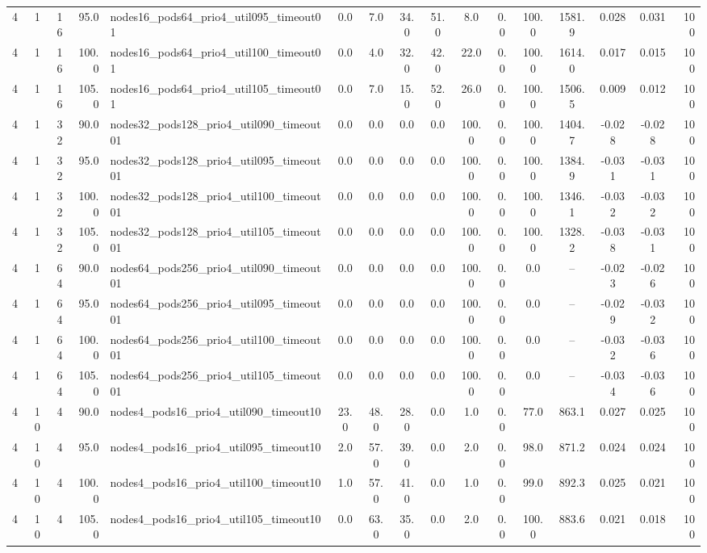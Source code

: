 \begin{tabular}{r r r r l c c c c c c c c c c r}
4 & 1 & 16 & 95.0 & nodes16\_pods64\_prio4\_util095\_timeout01 & 0.0 & 7.0 & 34.0 & 51.0 & 8.0 & 0.0 & 100.0 & 1581.9 & 0.028 & 0.031 & 100 \\
4 & 1 & 16 & 100.0 & nodes16\_pods64\_prio4\_util100\_timeout01 & 0.0 & 4.0 & 32.0 & 42.0 & 22.0 & 0.0 & 100.0 & 1614.0 & 0.017 & 0.015 & 100 \\
4 & 1 & 16 & 105.0 & nodes16\_pods64\_prio4\_util105\_timeout01 & 0.0 & 7.0 & 15.0 & 52.0 & 26.0 & 0.0 & 100.0 & 1506.5 & 0.009 & 0.012 & 100 \\
4 & 1 & 32 & 90.0 & nodes32\_pods128\_prio4\_util090\_timeout01 & 0.0 & 0.0 & 0.0 & 0.0 & 100.0 & 0.0 & 100.0 & 1404.7 & -0.028 & -0.028 & 100 \\
4 & 1 & 32 & 95.0 & nodes32\_pods128\_prio4\_util095\_timeout01 & 0.0 & 0.0 & 0.0 & 0.0 & 100.0 & 0.0 & 100.0 & 1384.9 & -0.031 & -0.031 & 100 \\
4 & 1 & 32 & 100.0 & nodes32\_pods128\_prio4\_util100\_timeout01 & 0.0 & 0.0 & 0.0 & 0.0 & 100.0 & 0.0 & 100.0 & 1346.1 & -0.032 & -0.032 & 100 \\
4 & 1 & 32 & 105.0 & nodes32\_pods128\_prio4\_util105\_timeout01 & 0.0 & 0.0 & 0.0 & 0.0 & 100.0 & 0.0 & 100.0 & 1328.2 & -0.038 & -0.031 & 100 \\
4 & 1 & 64 & 90.0 & nodes64\_pods256\_prio4\_util090\_timeout01 & 0.0 & 0.0 & 0.0 & 0.0 & 100.0 & 0.0 & 0.0 & -- & -0.023 & -0.026 & 100 \\
4 & 1 & 64 & 95.0 & nodes64\_pods256\_prio4\_util095\_timeout01 & 0.0 & 0.0 & 0.0 & 0.0 & 100.0 & 0.0 & 0.0 & -- & -0.029 & -0.032 & 100 \\
4 & 1 & 64 & 100.0 & nodes64\_pods256\_prio4\_util100\_timeout01 & 0.0 & 0.0 & 0.0 & 0.0 & 100.0 & 0.0 & 0.0 & -- & -0.032 & -0.036 & 100 \\
4 & 1 & 64 & 105.0 & nodes64\_pods256\_prio4\_util105\_timeout01 & 0.0 & 0.0 & 0.0 & 0.0 & 100.0 & 0.0 & 0.0 & -- & -0.034 & -0.036 & 100 \\
4 & 10 & 4 & 90.0 & nodes4\_pods16\_prio4\_util090\_timeout10 & 23.0 & 48.0 & 28.0 & 0.0 & 1.0 & 0.0 & 77.0 & 863.1 & 0.027 & 0.025 & 100 \\
4 & 10 & 4 & 95.0 & nodes4\_pods16\_prio4\_util095\_timeout10 & 2.0 & 57.0 & 39.0 & 0.0 & 2.0 & 0.0 & 98.0 & 871.2 & 0.024 & 0.024 & 100 \\
4 & 10 & 4 & 100.0 & nodes4\_pods16\_prio4\_util100\_timeout10 & 1.0 & 57.0 & 41.0 & 0.0 & 1.0 & 0.0 & 99.0 & 892.3 & 0.025 & 0.021 & 100 \\
4 & 10 & 4 & 105.0 & nodes4\_pods16\_prio4\_util105\_timeout10 & 0.0 & 63.0 & 35.0 & 0.0 & 2.0 & 0.0 & 100.0 & 883.6 & 0.021 & 0.018 & 100 \\

\end{tabular}
